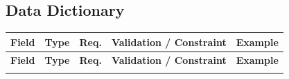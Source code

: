\documentclass[12pt,a4paper]{article}
\begin{document}
\subsection{Data Dictionary}

\begin{longtable}{@{}L{3.2cm}L{2.8cm}C{1.2cm}L{4cm}L{3.5cm}@{}}
  
    \textbf{Field} & \textbf{Type} & \textbf{Req.} & \textbf{Validation / Constraint} & \textbf{Example} \\
  \midrule
  \endfirsthead
  
    \textbf{Field} & \textbf{Type} & \textbf{Req.} & \textbf{Validation / Constraint} & \textbf{Example} \\
  \midrule
  \endhead
  
  \endfoot


\end{longtable}
\end{document}
